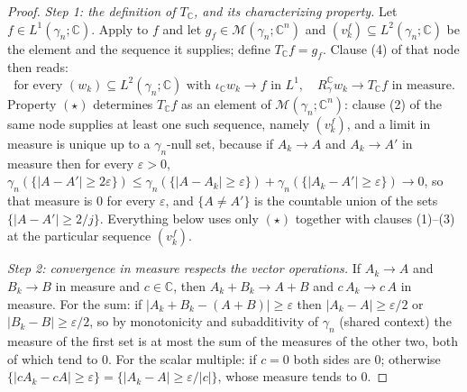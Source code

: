 \begin{proof}
\emph{Step 1: the definition of $T_{\mathbb{C}}$, and its characterizing
property.}
Let $f \in L^1(\gamma_n;\mathbb{C})$.  Apply  to
$f$ and let $g_f \in \mathcal{M}(\gamma_n;\mathbb{C}^n)$ and
$(v^f_k) \subseteq L^2(\gamma_n;\mathbb{C})$ be the element and the sequence it
supplies; define $T_{\mathbb{C}}f = g_f$.  Clause (4) of that node then reads:
\begin{equation*}
  \text{for every } (w_k) \subseteq L^2(\gamma_n;\mathbb{C}) \text{ with }
  \iota_{\mathbb{C}} w_k \to f \text{ in } L^1,
  \quad R_\gamma^{\mathbb{C}} w_k \to T_{\mathbb{C}}f \text{ in measure.}
  \tag{$\star$}
\end{equation*}
Property $(\star)$ determines $T_{\mathbb{C}}f$ as an element of
$\mathcal{M}(\gamma_n;\mathbb{C}^n)$: clause (2) of the same node supplies at
least one such sequence, namely $(v^f_k)$, and a limit in measure is unique up to
a $\gamma_n$-null set, because if $A_k \to A$ and $A_k \to A'$ in measure then for
every $\varepsilon > 0$,
$\gamma_n(\{|A - A'| \geq 2\varepsilon\})
 \leq \gamma_n(\{|A - A_k| \geq \varepsilon\})
    + \gamma_n(\{|A_k - A'| \geq \varepsilon\}) \to 0$, so that measure is $0$
for every $\varepsilon$, and $\{A \neq A'\}$ is the countable union of the sets
$\{|A-A'| \geq 2/j\}$.  Everything below uses only $(\star)$ together with
clauses (1)--(3) at the particular sequence $(v^f_k)$.

\emph{Step 2: convergence in measure respects the vector operations.}
If $A_k \to A$ and $B_k \to B$ in measure and $c \in \mathbb{C}$, then
$A_k + B_k \to A + B$ and $c\,A_k \to c\,A$ in measure.  For the sum: if
$|A_k + B_k - (A+B)| \geq \varepsilon$ then $|A_k - A| \geq \varepsilon/2$ or
$|B_k - B| \geq \varepsilon/2$, so by monotonicity and subadditivity of
$\gamma_n$ (shared context) the measure of the first set is at most the sum of
the measures of the other two, both of which tend to $0$.  For the scalar
multiple: if $c = 0$ both sides are $0$; otherwise
$\{|c A_k - cA| \geq \varepsilon\} = \{|A_k - A| \geq \varepsilon/|c|\}$, whose
measure tends to $0$.


\end{proof}
